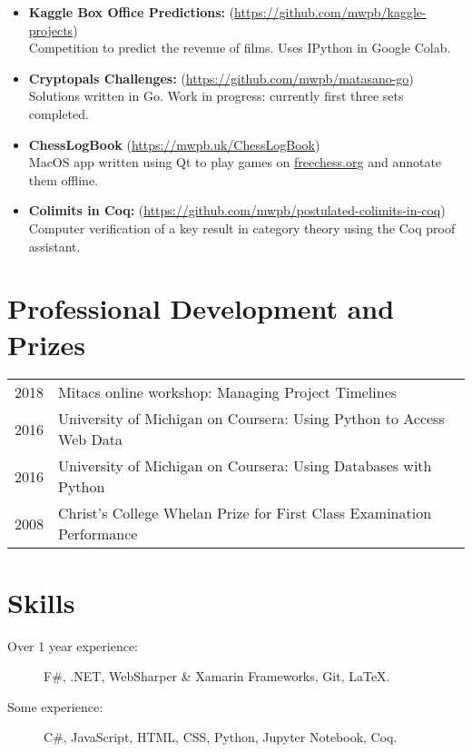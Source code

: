 \documentclass[a4paper,10pt]{article}
\begin{document}
\begin{itemize}
  \item \textbf{Kaggle Box Office Predictions:} (\url{https://github.com/mwpb/kaggle-projects})\\
  Competition to predict the revenue of films. 
  Uses IPython in Google Colab.
  \item \textbf{Cryptopals Challenges:} (\url{https://github.com/mwpb/matasano-go})\\
  Solutions written in Go. Work in progress: currently first three sets completed.
  \item \textbf{ChessLogBook} (\url{https://mwpb.uk/ChessLogBook})\\
  MacOS app written using Qt to play games on \url{freechess.org} and annotate them offline.
  \item \textbf{Colimits in Coq:} (\url{https://github.com/mwpb/postulated-colimits-in-coq})\\
  Computer verification of a key result in category theory using the Coq proof assistant.
\end{itemize}

\section{Professional Development and Prizes}
\begin{tabular}{rl}
  2018 & Mitacs online workshop: Managing Project Timelines\\
  2016 & University of Michigan on Coursera: Using Python to Access Web Data\\
  2016 & University of Michigan on Coursera: Using Databases with Python\\
  2008 & Christ's College Whelan Prize for First Class Examination Performance
\end{tabular}

\section{Skills}
\begin{description}
  \item[Over 1 year experience:]F\#, .NET, WebSharper \& Xamarin Frameworks, Git, LaTeX.
  \item[Some experience:] C\#, JavaScript, HTML, CSS, Python, Jupyter Notebook, Coq.
\end{description}
\end{document}

